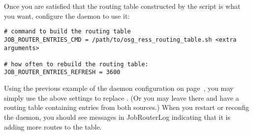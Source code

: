 Once you are satisfied that the routing table constructed by the
script is what you want, configure the  daemon to use it:

\begin{verbatim}
# command to build the routing table
JOB_ROUTER_ENTRIES_CMD = /path/to/osg_ress_routing_table.sh <extra arguments>

# how often to rebuild the routing table:
JOB_ROUTER_ENTRIES_REFRESH = 3600
\end{verbatim}

Using the previous example of the  daemon configuration on
page~\pageref{ExampleJobRouterConfiguration}, you may simply use the
above settings to replace .  (Or you may
leave  there and have a routing table
containing entries from both sources.)  When you restart or reconfig
the  daemon, you should see messages in JobRouterLog indicating that it
is adding more routes to the table.
